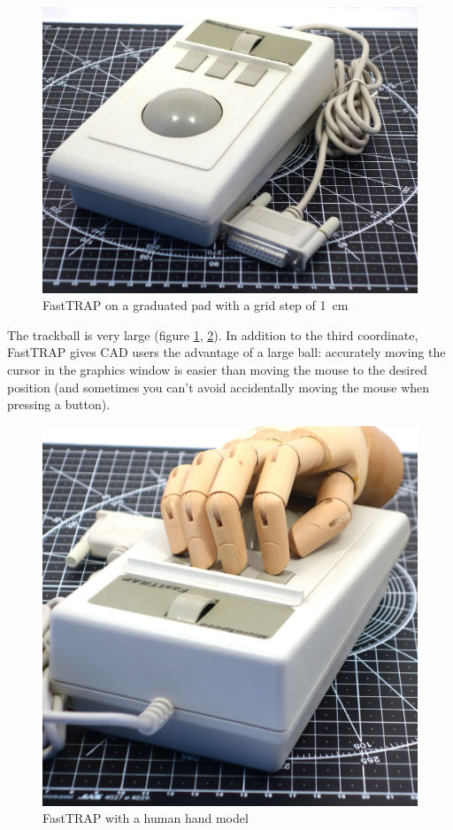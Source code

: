 \documentclass[11pt, a4paper]{article}
\begin{document}
\begin{figure}[h]
   \centering
    \includegraphics[scale=0.3]{1987_microspeed_fasttrap/size_15.jpg}
    \caption{FastTRAP on a graduated pad with a grid step of 1~cm}
    \label{fig:FastTRAPSize}
\end{figure}

The trackball is very large (figure \ref{fig:FastTRAPSize}, \ref{fig:FastTRAPHand}). In addition to the third coordinate, FastTRAP gives CAD users the advantage of a large ball: accurately moving the cursor in the graphics window is easier than moving the mouse to the desired position (and sometimes you can't avoid accidentally moving the mouse when pressing a button).

\begin{figure}[h]
    \centering
    \includegraphics[scale=0.25]{1987_microspeed_fasttrap/hand_15.jpg}
    \caption{FastTRAP with a human hand model}
    \label{fig:FastTRAPHand}
\end{figure}
\end{document}

